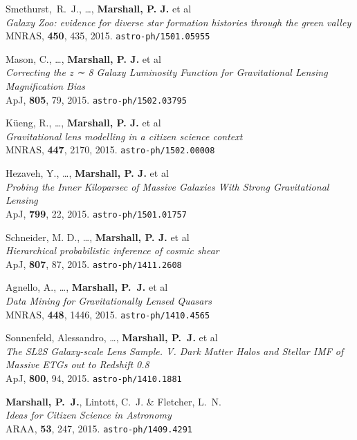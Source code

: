 \begin{revnumerate}
\item{Smethurst,~R.~J., \ldots, \textbf{Marshall, P. J.} et al\\
\textit{Galaxy Zoo: evidence for diverse star formation histories through the green valley}\\
MNRAS, \textbf{450}, 435, 2015.
\texttt{astro-ph/1501.05955}
}

\item{Mason, C., \ldots, \textbf{Marshall, P. J.} et al\\
\textit{Correcting the z ∼ 8 Galaxy Luminosity Function for Gravitational Lensing Magnification Bias}\\
ApJ, \textbf{805}, 79, 2015.
\texttt{astro-ph/1502.03795}
}

\item{K\"{u}eng, R., \ldots, \textbf{Marshall, P. J.} et al\\
\textit{Gravitational lens modelling in a citizen science context}\\
MNRAS, \textbf{447}, 2170, 2015.
\texttt{astro-ph/1502.00008}
}

\item{Hezaveh, Y., \ldots, \textbf{Marshall, P. J.} et al\\
\textit{Probing the Inner Kiloparsec of Massive Galaxies With Strong Gravitational Lensing}\\
ApJ, {\bf 799}, 22, 2015.
\texttt{astro-ph/1501.01757}
}

\item{Schneider, M. D., \ldots, \textbf{Marshall, P. J.} et al\\
\textit{Hierarchical probabilistic inference of cosmic shear}\\
ApJ, \textbf{807}, 87, 2015.
\texttt{astro-ph/1411.2608}
}

\item{Agnello, A., \ldots, \textbf{Marshall, P.~J.} et al\\
\textit{Data Mining for Gravitationally Lensed Quasars}\\
MNRAS, \textbf{448}, 1446, 2015.
\texttt{astro-ph/1410.4565}
}

\item{Sonnenfeld, Alessandro, \ldots, \textbf{Marshall, P.~J.} et al\\
\textit{The SL2S Galaxy-scale Lens Sample. V. Dark Matter Halos and Stellar IMF of Massive ETGs out to Redshift 0.8}\\
ApJ, \textbf{800}, 94, 2015.
\texttt{astro-ph/1410.1881}
}

\item{\textbf{Marshall, P.~J.}, Lintott, C.~J. \& Fletcher, L.~N.\\
\textit{Ideas for Citizen Science in Astronomy}\\
ARAA, \textbf{53}, 247, 2015.
\texttt{astro-ph/1409.4291}
}


\end{revnumerate}
